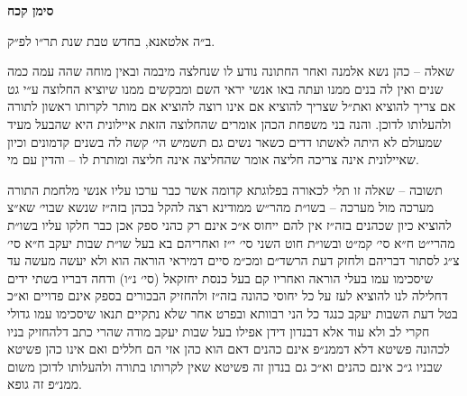 \documentclass[12pt, openany]{book}
\newcommand{\chapname}{}
\newcommand{\newchap}[1]{
	\addcontentsline{toc}{chapter}{#1}
	\renewcommand{\chapname}{#1}
		\begin{center}
			\textbf{%
\fontsize{16pt}{16pt}\selectfont
				#1}
		\end{center}
}
\begin{document}
\newchap{סימן קכח}
\begin{multicols}{2}
ב״ה אלטאנא, בחדש טבת שנת תר״ו לפ״ק.\\\vspace{0pt}

שאלה – כהן נשא אלמנה ואחר החתונה נודע לו שנחלצה מיבמה ובאין מוחה שהה עמה כמה שנים ואין לה בנים ממנו ועתה באו אנשי יראי השם ומבקשים ממנו שיוציא החלוצה ע״י גט אם צריך להוציא ואת״ל שצריך להוציא אם אינו רוצה להוציא אם מותר לקרותו ראשון לתורה ולהעלותו לדוכן. והנה בני משפחת הכהן אומרים שהחלוצה הזאת איילונית היא שהבעל מעיד שמעולם לא היתה לאשתו דדים כשאר נשים גם תשמיש הי׳ קשה לה בשנים קדמונים וכיון שאיילונית אינה צריכה חליצה אומר שהחליצה אינה חליצה ומותרת לו – והדין עם מי.\\\vspace{0pt}

תשובה – שאלה זו תלי לכאורה בפלוגתא קדומה אשר כבר ערכו עליו אנשי מלחמת התורה מערכה מול מערכה – בשו״ת מהר״ש ממודינא רצה להקל בכהן בזה״ז שנשא שבוי׳ שא״צ להוציא כיון שכהנים בזה״ז אין להם ייחוס א״כ אינם רק כהני ספק אכן כבר חלקו עליו בשו״ת מהרי״ט ח״א סי׳ קמ״ט ובשו״ת חוט השני סי׳ י״ז ואחריהם בא בעל שו״ת שבות יעקב ח״א סי׳ צ״ג לסתור דבריהם ולחזק דעת הרשד״ם ומכ״מ סיים דמיראי הוראה הוא ולא יעשה מעשה עד שיסכימו עמו בעלי הוראה ואחריו קם בעל כנסת יחזקאל (סי׳ נ״ו) ודחה דבריו בשתי ידים דחלילה לנו להוציא לעז על כל יחוסי כהונה בזה״ז ולהחזיק הבכורים בספק אינם פדויים וא״כ בטל דעת השבות יעקב כנגד כל הני רבוותא ובפרט אחר שלא נתקיים תנאו שיסכימו עמו גדולי חקרי לב ולא עוד אלא דבנדון דידן אפילו בעל שבות יעקב מודה שהרי כתב דלהחזיק בניו לכהונה פשיטא דלא דממנ״פ אינם כהנים דאם הוא כהן אזי הם חללים ואם אינו כהן פשיטא שבניו ג״כ אינם כהנים וא״כ גם בנדון זה פשיטא שאין לקרותו בתורה ולהעלותו לדוכן משום ממנ״פ זה גופא.\\\vspace{0pt}


\end{multicols}
\end{document}

